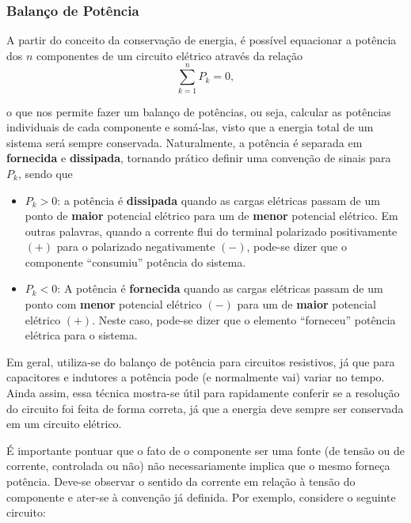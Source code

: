 \documentclass{article}
\numberwithin{equation}{section}
\begin{document}

\subsubsection{Balanço de Potência}
\label{subsubsec:balancodepot}
A partir do conceito da conservação de energia, é possível equacionar a potência dos $n$ componentes de um circuito elétrico através da relação
\begin{equation}
    \sum_{k=1}^{n} P_k = 0,
\end{equation}

\noindent o que nos permite fazer um balanço de potências, ou seja, calcular as potências individuais de cada componente e somá-las, visto que a energia total de um sistema será sempre conservada. Naturalmente, a potência é separada em \textbf{fornecida} e \textbf{dissipada}, tornando prático definir uma convenção de sinais para $P_k$, sendo que
\begin{itemize}
    \item \hspace{0.2cm} $P_k > 0$: a potência é \textbf{dissipada} quando as cargas elétricas passam de um ponto de \textbf{maior} potencial elétrico para um de \textbf{menor} potencial elétrico. Em outras palavras, quando a corrente flui do terminal polarizado positivamente $(+)$ para o polarizado negativamente $(-)$, pode-se dizer que o componente ``consumiu'' potência do sistema.
    \item \hspace{0.2cm} $P_k < 0$: A potência é \textbf{fornecida} quando as cargas elétricas passam de um ponto com \textbf{menor} potencial elétrico $(-)$ para um de \textbf{maior} potencial elétrico $(+)$. Neste caso, pode-se dizer que o elemento ``forneceu'' potência elétrica para o sistema.
\end{itemize}

Em geral, utiliza-se do balanço de potência para circuitos resistivos, já que para capacitores e indutores a potência pode (e normalmente vai) variar no tempo. Ainda assim, essa técnica mostra-se útil para rapidamente conferir se a resolução do circuito foi feita de forma correta, já que a energia deve sempre ser conservada em um circuito elétrico.

É importante pontuar que o fato de o componente ser uma fonte (de tensão ou de corrente, controlada ou não) não necessariamente implica que o mesmo forneça potência. Deve-se observar o sentido da corrente em relação à tensão do componente e ater-se à convenção já definida. Por exemplo, considere o seguinte circuito:
\end{document}
